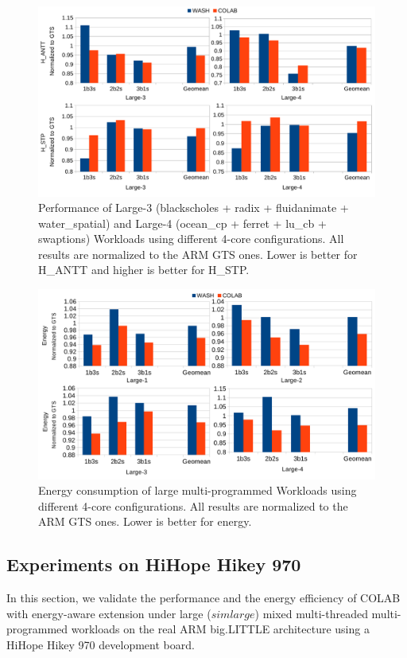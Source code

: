 \begin{figure}
\centering
\includegraphics[scale=0.32]{figures/4core.pdf}
\caption{Performance of Large-3 (blackscholes + radix + fluidanimate + water\_spatial) and Large-4 (ocean\_cp + ferret + lu\_cb + swaptions) Workloads using different 4-core configurations. All results are normalized to the ARM GTS ones. Lower is better for H\_ANTT and higher is better for H\_STP.}
\label{4core}
\end{figure}

\begin{figure}
\centering
\includegraphics[scale=0.32]{figures/energy_eva.pdf}
\caption{Energy consumption of large multi-programmed Workloads using different 4-core configurations. All results are normalized to the ARM GTS ones. Lower is better for energy.}
\label{elarge}
\end{figure}

\subsection{Experiments on HiHope Hikey 970}
In this section, we validate the performance and the energy efficiency of COLAB with energy-aware extension under large ($simlarge$) mixed multi-threaded multi-programmed workloads on the real ARM big.LITTLE architecture using a HiHope Hikey 970 development board. 

